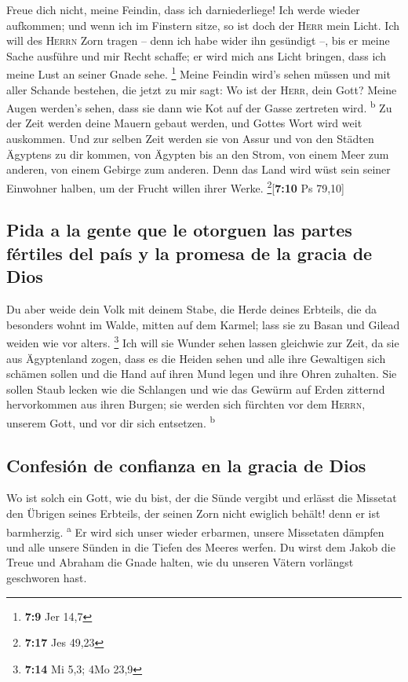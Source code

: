  Freue dich nicht, meine Feindin, dass ich darniederliege!
Ich werde wieder aufkommen; und wenn ich im Finstern sitze, so ist doch
der \textsc{Herr} mein Licht.  Ich will des \textsc{Herrn}
Zorn tragen -- denn ich habe wider ihn gesündigt --, bis er meine Sache
ausführe und mir Recht schaffe; er wird mich ans Licht bringen, dass ich
meine Lust an seiner Gnade sehe. \footnote{\textbf{7:9} Jer 14,7}
 Meine Feindin wird's sehen müssen und mit aller Schande
bestehen, die jetzt zu mir sagt: Wo ist der \textsc{Herr}, dein Gott?
Meine Augen werden's sehen, dass sie dann wie Kot auf der Gasse
zertreten wird. \textsuperscript{b}  Zu der Zeit werden
deine Mauern gebaut werden, und Gottes Wort wird weit auskommen.
 Und zur selben Zeit werden sie von Assur und von den
Städten Ägyptens zu dir kommen, von Ägypten bis an den Strom, von einem
Meer zum anderen, von einem Gebirge zum anderen.  Denn
das Land wird wüst sein seiner Einwohner halben, um der Frucht willen
ihrer Werke. \footnote{\textbf{7:17} Jes 49,23}{[}\textbf{7:10} Ps
79,10{]}

\hypertarget{pida-a-la-gente-que-le-otorguen-las-partes-fuxe9rtiles-del-pauxeds-y-la-promesa-de-la-gracia-de-dios}{%
\subsection{Pida a la gente que le otorguen las partes fértiles del país
y la promesa de la gracia de
Dios}\label{pida-a-la-gente-que-le-otorguen-las-partes-fuxe9rtiles-del-pauxeds-y-la-promesa-de-la-gracia-de-dios}}

 Du aber weide dein Volk mit deinem Stabe, die Herde
deines Erbteils, die da besonders wohnt im Walde, mitten auf dem Karmel;
lass sie zu Basan und Gilead weiden wie vor alters. \footnote{\textbf{7:14}
  Mi 5,3; 4Mo 23,9}  Ich will sie Wunder sehen lassen
gleichwie zur Zeit, da sie aus Ägyptenland zogen,  dass
es die Heiden sehen und alle ihre Gewaltigen sich schämen sollen und die
Hand auf ihren Mund legen und ihre Ohren zuhalten.  Sie
sollen Staub lecken wie die Schlangen und wie das Gewürm auf Erden
zitternd hervorkommen aus ihren Burgen; sie werden sich fürchten vor dem
\textsc{Herrn}, unserem Gott, und vor dir sich entsetzen.
\textsuperscript{b}

\hypertarget{confesiuxf3n-de-confianza-en-la-gracia-de-dios}{%
\subsection{Confesión de confianza en la gracia de
Dios}\label{confesiuxf3n-de-confianza-en-la-gracia-de-dios}}

 Wo ist solch ein Gott, wie du bist, der die Sünde
vergibt und erlässt die Missetat den Übrigen seines Erbteils, der seinen
Zorn nicht ewiglich behält! denn er ist barmherzig. \textsuperscript{a}
 Er wird sich unser wieder erbarmen, unsere Missetaten
dämpfen und alle unsere Sünden in die Tiefen des Meeres werfen.
 Du wirst dem Jakob die Treue und Abraham die Gnade
halten, wie du unseren Vätern vorlängst geschworen hast.

